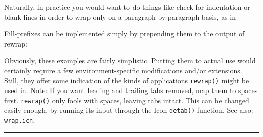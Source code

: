 Naturally, in practice you would want to do things like check for
indentation or blank lines in order to wrap only on a paragraph by
paragraph basis, as in


\noindent Fill-prefixes can be implemented simply by prepending them
to the output of rewrap:


Obviously, these examples are fairly simplistic. Putting them to actual
use would certainly require a few environment-specific modifications
and/or extensions. Still, they offer some indication of the kinds of
applications \texttt{rewrap()} might be used in. Note: If you want
leading and trailing tabs removed, map them to spaces first.
\texttt{rewrap()} only fools with spaces, leaving tabs intact. This can
be changed easily enough, by running its input through the Icon
\texttt{detab()} function.
See also: \texttt{wrap.icn}.

\vspace{0.25cm}\hrule{}

